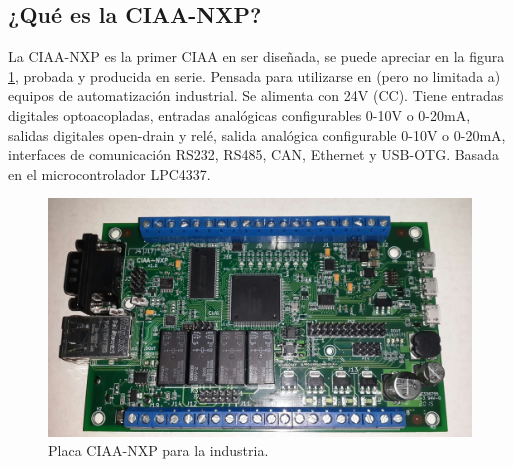 \subsection{¿Qué es la CIAA-NXP?}

La CIAA-NXP es la primer CIAA en ser diseñada, se puede apreciar en la figura \ref{fig:ciaaxp}, probada y producida en serie. Pensada para utilizarse en (pero no limitada a) equipos de automatización industrial. Se alimenta con 24V (CC). Tiene entradas digitales optoacopladas, entradas analógicas configurables 0-10V o 0-20mA, salidas digitales open-drain y relé, salida analógica configurable 0-10V o 0-20mA, interfaces de comunicación RS232, RS485, CAN, Ethernet y USB-OTG. Basada en el microcontrolador LPC4337. 

\begin{figure}[ht]
  \centering
  \includegraphics[scale=.2]{./Figures/ciaa.png}
  \caption{Placa CIAA-NXP para la industria.}
  \label{fig:ciaaxp}
\end{figure}

